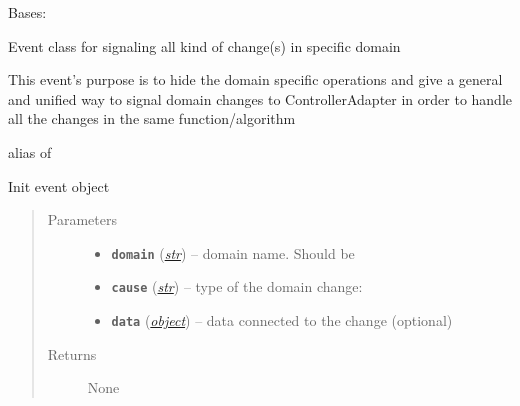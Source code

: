 \documentclass[letterpaper,10pt,english]{sphinxmanual}
\begin{document}
\begin{fulllineitems}
\label{util/adapter:escape.util.adapter.DomainChangedEvent}
Bases: 

Event class for signaling all kind of change(s) in specific domain

This event's purpose is to hide the domain specific operations and give a
general and unified way to signal domain changes to ControllerAdapter in
order to handle all the changes in the same function/algorithm

\begin{fulllineitems}
\label{util/adapter:escape.util.adapter.DomainChangedEvent.type}
alias of 

\end{fulllineitems}


\begin{fulllineitems}
\label{util/adapter:escape.util.adapter.DomainChangedEvent.__init__}
Init event object
\begin{quote}\begin{description}
\item[{Parameters}] \leavevmode\begin{itemize}
\item {} 
\textbf{\texttt{domain}} (\href{https://docs.python.org/2.7/library/functions.html\#str}{\emph{str}}) -- domain name. Should be {\hyperref[util/adapter:escape.util.adapter.AbstractDomainAdapter.name]{\emph{}}}

\item {} 
\textbf{\texttt{cause}} (\href{https://docs.python.org/2.7/library/functions.html\#str}{\emph{str}}) -- type of the domain change: {\hyperref[util/adapter:escape.util.adapter.DomainChangedEvent.type]{\emph{}}}

\item {} 
\textbf{\texttt{data}} (\href{https://docs.python.org/2.7/library/functions.html\#object}{\emph{object}}) -- data connected to the change (optional)

\end{itemize}

\item[{Returns}] \leavevmode
None

\end{description}\end{quote}

\end{fulllineitems}


\end{fulllineitems}
\end{document}

